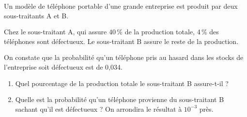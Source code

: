\medskip

Un modèle de téléphone portable d'une grande entreprise est produit par deux sous-traitants A et B.

\medskip

Chez le sous-traitant A, qui assure 40\,\% de la production totale, 4\,\% des téléphones sont défectueux.
Le sous-traitant B assure le reste de la production.

On constate que la probabilité qu'un téléphone pris au hasard dans les stocks de l'entreprise soit défectueux est de 0,034.

\medskip

\begin{enumerate}
\item Quel pourcentage de la production totale le sous-traitant B assure-t-il ?
\item Quelle est la probabilité qu'un téléphone provienne du sous-traitant B
sachant qu'il est défectueux ? On arrondira le résultat à $10^{-3}$ près.
\end{enumerate}

\bigskip
